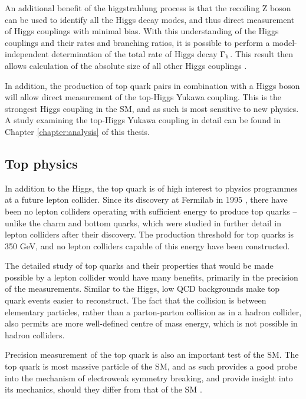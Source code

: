 An additional benefit of the higgstrahlung process is that the recoiling Z boson can be used to identify all the Higgs decay modes, and thus direct measurement of Higgs couplings with minimal bias. With this understanding of the Higgs couplings and their rates and branching ratios, it is possible to perform a model-independent determination of the total rate of Higgs decay $\Gamma\textsubscript{h}$. This result then allows calculation of the absolute size of all other Higgs couplings \cite{ilc-tdr-physics}.

In addition, the production of top quark pairs in combination with a Higgs boson will allow direct measurement of the top-Higgs Yukawa coupling. This is the strongest Higgs coupling in the \acrshort{SM}, and as such is most sensitive to new physics. A study examining the top-Higgs Yukawa coupling in detail can be found in Chapter \ref{chapter:analysis} of this thesis.

\subsection{Top physics}
In addition to the Higgs, the top quark is of high interest to physics programmes at a future lepton collider. Since its discovery at Fermilab in 1995 \cite{top-quark}, there have been no lepton colliders operating with sufficient energy to produce top quarks -- unlike the charm and bottom quarks, which were studied in further detail in lepton colliders after their discovery. The production threshold for top quarks is 350 GeV, and no lepton colliders capable of this energy have been constructed.

The detailed study of top quarks and their properties that would be made possible by a lepton collider would have many benefits, primarily in the precision of the measurements. Similar to the Higgs, low \acrshort{QCD} backgrounds make top quark events easier to reconstruct. The fact that the collision is between elementary particles, rather than a parton-parton collision as in a hadron collider, also permits are more well-defined centre of mass energy, which is not possible in hadron colliders.

Precision measurement of the top quark is also an important test of the \acrshort{SM}. The top quark is most massive particle of the \acrshort{SM}, and as such provides a good probe into the mechanism of electroweak symmetry breaking, and provide insight into its mechanics, should they differ from that of the \acrlong{SM} \cite{top-quark-lhc}. 

